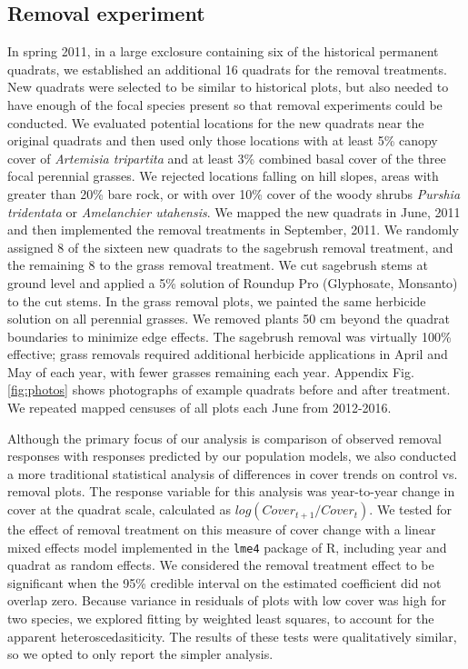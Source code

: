 \documentclass[11pt]{article}
\begin{document}
\begin{doublespacing}
\subsection*{Removal experiment}

In spring 2011, in a large exclosure containing six of the historical permanent quadrats, we established an additional 16 quadrats for the removal treatments. New quadrats were selected to be similar to historical plots, but also needed to have enough of the focal species present so that removal experiments could be conducted. We evaluated potential locations for the new quadrats near the original quadrats and then used only those locations with at least 5\% canopy cover of \textit{Artemisia tripartita} and at least 3\% combined basal cover of the three focal perennial grasses. We rejected locations falling on hill slopes, areas with greater than 20\% bare rock, or with over 10\% cover of the woody shrubs \textit{Purshia tridentata} or \textit{Amelanchier utahensis}. We mapped the new quadrats in June, 2011 and then implemented the removal treatments in September, 2011. We randomly assigned 8 of the sixteen new quadrats to the sagebrush removal treatment, and the remaining 8 to the grass removal treatment. We cut sagebrush stems at ground level and applied a 5\% solution of Roundup Pro (Glyphosate, Monsanto) to the cut stems. In the grass removal plots, we painted the same herbicide solution on all perennial grasses. We removed plants 50 cm beyond the quadrat boundaries to minimize edge effects. The sagebrush removal was virtually 100\% effective; grass removals required additional herbicide applications in April and May of each year, with fewer grasses remaining each year. Appendix Fig. \ref{fig:photos} shows photographs of example quadrats before and after treatment. We repeated mapped censuses of all plots each June from 2012-2016.

Although the primary focus of our analysis is comparison of observed removal responses with responses predicted by our population models, we also conducted a more traditional statistical analysis of differences in cover trends on control vs. removal plots. The response variable for this analysis was year-to-year change in cover at the quadrat scale, calculated as $log(Cover_{t+1}/Cover_t)$. We tested for the effect of removal treatment on this measure of cover change with a linear mixed effects model implemented in the \texttt{lme4} package \citep{Bates2015} of R, including year and quadrat as random effects. We considered the removal treatment effect to be significant when the 95\% credible interval on the estimated coefficient did not overlap zero.  Because variance in residuals of plots with low cover was high for two species, we explored fitting by weighted least squares, to account for the apparent heteroscedasiticity. The results of these tests were qualitatively similar, so we opted to only report the simpler analysis.


\end{doublespacing}
\end{document}
